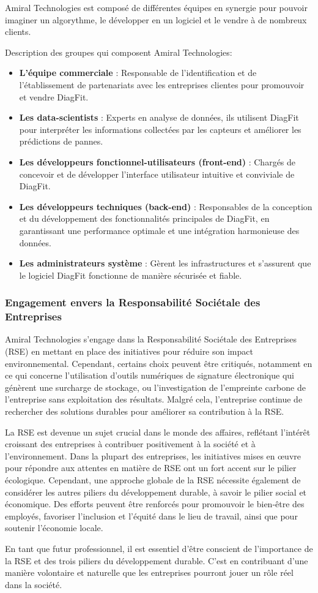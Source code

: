 Amiral Technologies est composé de différentes équipes en synergie pour pouvoir imaginer un algorythme, le développer en un logiciel et le vendre à de nombreux clients.

Description des groupes qui composent Amiral Technologies:
\begin{itemize}
    \item \textbf{L'équipe commerciale} : Responsable de l'identification et de l'établissement de partenariats avec les entreprises clientes pour promouvoir et vendre DiagFit.
    \item \textbf{Les data-scientists} : Experts en analyse de données, ils utilisent DiagFit pour interpréter les informations collectées par les capteurs et améliorer les prédictions de pannes.
    \item \textbf{Les développeurs fonctionnel-utilisateurs (front-end)} : Chargés de concevoir et de développer l'interface utilisateur intuitive et conviviale de DiagFit.
    \item \textbf{Les développeurs techniques (back-end)} : Responsables de la conception et du développement des fonctionnalités principales de DiagFit, en garantissant une performance optimale et une intégration harmonieuse des données.
    \item \textbf{Les administrateurs système} : Gèrent les infrastructures et s'assurent que le logiciel DiagFit fonctionne de manière sécurisée et fiable.
\end{itemize}




\subsubsection{Engagement envers la Responsabilité Sociétale des Entreprises}
Amiral Technologies s'engage dans la Responsabilité Sociétale des Entreprises (RSE) en mettant en place des initiatives pour réduire son impact environnemental.
Cependant, certains choix peuvent être critiqués, notamment en ce qui concerne l'utilisation d'outils numériques de signature électronique qui génèrent une surcharge de stockage, ou l'investigation de l'empreinte carbone de l'entreprise sans exploitation des résultats.
Malgré cela, l'entreprise continue de rechercher des solutions durables pour améliorer sa contribution à la RSE.

La RSE est devenue un sujet crucial dans le monde des affaires, reflétant l'intérêt croissant des entreprises à contribuer positivement à la société et à l'environnement.
Dans la plupart des entreprises, les initiatives mises en œuvre pour répondre aux attentes en matière de RSE ont un fort accent sur le pilier écologique.
Cependant, une approche globale de la RSE nécessite également de considérer les autres piliers du développement durable, à savoir le pilier social et économique.
Des efforts peuvent être renforcés pour promouvoir le bien-être des employés, favoriser l'inclusion et l'équité dans le lieu de travail, ainsi que pour soutenir l'économie locale.

En tant que futur professionnel, il est essentiel d'être conscient de l'importance de la RSE et des trois piliers du développement durable.
C'est en contribuant d'une manière volontaire et naturelle que les entreprises pourront jouer un rôle réel dans la société.

